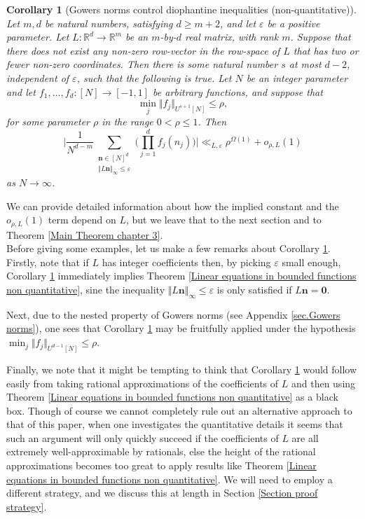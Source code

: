 \documentclass[12pt,a4paper,twoside,reqno]{amsart}
\newtheorem{Corollary}[Theorem]{Corollary}
\numberwithin{equation}{section}
\begin{document}
\begin{Corollary}[Gowers norms control diophantine inequalities (non-quantitative)]
\label{much easier to state}
Let $m,d$ be natural numbers, satisfying $d\geqslant m+2$, and let $\varepsilon$ be a positive parameter. Let $L:\mathbb{R}^d \longrightarrow \mathbb{R}^m$ be an $m$-by-$d$ real matrix, with rank $m$. Suppose that there does not exist any non-zero row-vector in the row-space of $L$ that has two or fewer non-zero coordinates. Then there is some natural number $s$ at most $d-2$, independent of $\varepsilon$, such that the following is true. Let $N$ be an integer parameter and let $f_1,\dots,f_d:[N]\longrightarrow [-1,1]$ be arbitrary functions, and suppose that \[ \min_j \Vert f_j \Vert_{U^{s+1}[N]} \leqslant \rho,\] for some parameter $\rho$ in the range $0<\rho \leqslant 1$. Then \[ \Big\vert \frac{1}{N^{d-m}}\sum\limits_{\substack{\mathbf{n} \in [N]^d \\ \Vert L \mathbf{n} \Vert_\infty \leqslant \varepsilon}} \Big( \prod\limits_{j=1}^d f_j(n_j) \Big)\Big\vert \ll_{L,\varepsilon} \rho^{\Omega(1)} + o_{\rho,L}(1)\] as $N\rightarrow \infty$.
\end{Corollary}

\noindent  We can provide detailed information about how the implied constant and the $o_{\rho,L}(1)$ term depend on $L$, but we leave that to the next section and to Theorem \ref{Main Theorem chapter 3}. \\


Before giving some examples, let us make a few remarks about Corollary \ref{much easier to state}. Firstly, note that if $L$ has integer coefficients then, by picking $\varepsilon$ small enough, Corollary \ref{much easier to state} immediately implies Theorem \ref{Linear equations in bounded functions non quantitative}, sine the inequality $\Vert L\mathbf{n}\Vert_\infty \leqslant \varepsilon$ is only satisfied if $L\mathbf{n} = \mathbf{0}$. 

Next, due to the nested property of Gowers norms (see Appendix \ref{sec.Gowers norms}), one sees that Corollary \ref{much easier to state} may be fruitfully applied under the hypothesis $\min_j\Vert f_j\Vert_{U^{d-1}[N]} \leqslant \rho$.

Finally, we note that it might be tempting to think that Corollary \ref{much easier to state} would follow easily from taking rational approximations of the coefficients of $L$ and then using Theorem \ref{Linear equations in bounded functions non quantitative} as a black box. Though of course we cannot completely rule out an alternative approach to that of this paper, when one investigates the quantitative details it seems that such an argument will only quickly succeed if the coefficients of $L$ are all extremely well-approximable by rationals, else the height of the rational approximations becomes too great to apply results like Theorem \ref{Linear equations in bounded functions non quantitative}. We will need to employ a different strategy, and we discuss this at length in Section \ref{Section proof strategy}. \\
\end{document}
